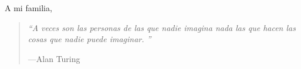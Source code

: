 \begin{dedication}

A mi familia,

\begin{quote}\it
	\textquotedblleft A veces son las personas de las que nadie imagina nada las que hacen las cosas que nadie puede imaginar. \textquotedblright

	\hspace{1em plus 1fill}---Alan Turing
\end{quote}

\end{dedication}